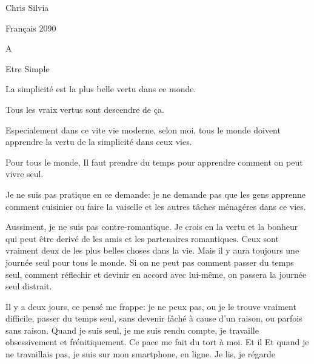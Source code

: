 \documentclass{article}
\begin{document}
\begin{flushright}
Chris Silvia

Français 2090


A

\end{flushright}

\begin{centering}

Etre Simple

\end{centering}

\begin{doublespace}

La simplicité est la plus belle vertu dans ce monde.

Tous les vraix vertus sont descendre de ça.

Especialement dans ce vite vie moderne, selon moi,
	tous le monde doivent apprendre la vertu de la simplicité
	dans ceux vies.


Pour tous le monde, Il faut prendre du temps pour apprendre
	comment on peut vivre seul.

Je ne suis pas pratique en ce demande: je ne demande pas que
	les gens apprenne comment cuisinier ou faire la vaiselle
	et les autres tâches ménagéres dans ce vies.

Aussiment, je ne suis pas contre-romantique.
Je crois en la vertu et la bonheur qui peut être derivé de les
	amis et les partenaires romantiques.
Ceux sont vraiment deux de les plus belles choses dans la vie.
Mais il y aura toujours une journée seul pour tous le monde.
Si on ne peut pas comment passer du temps seul, comment réflechir
	et devinir en accord avec lui-même, on passera la journée seul
	distrait.

Il y a deux jours, ce pensé me frappe: je ne peux pas, ou je le trouve
	vraiment difficile, passer du temps seul, sans devenir fâché
	à cause d'un raison, ou parfois sans raison.
Quand je suis seul, je me suis rendu compte, je travaille obsessivement
	et frénitiquement.
Ce pace me fait du tort à moi.
Et il
Et quand je ne travaillais pas, je suis sur mon smartphone, en ligne.
Je lis, je régarde 



\end{doublespace}
\end{document}
